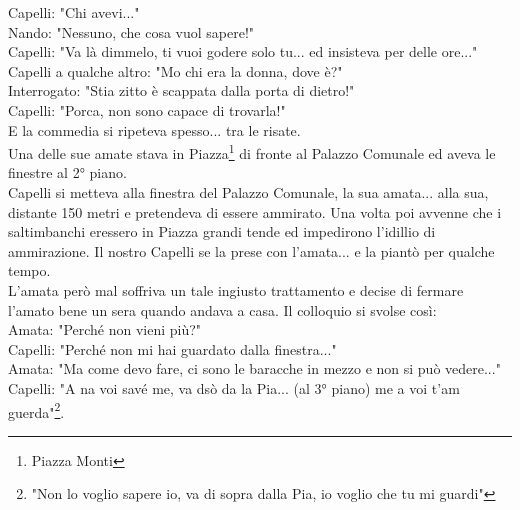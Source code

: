 Capelli: "Chi avevi..."\\
Nando: "Nessuno, che cosa vuol sapere!"\\
Capelli: "Va là dimmelo, ti vuoi godere solo tu... ed insisteva per delle ore..."\\
Capelli a qualche altro: "Mo chi era la donna, dove è?"\\
Interrogato: "Stia zitto è scappata dalla porta di dietro!"\\
Capelli: "Porca, non sono capace di trovarla!"\\
E la commedia si ripeteva spesso... tra le risate.\\
Una delle sue amate stava in Piazza\footnote{Piazza Monti} di fronte al Palazzo Comunale ed aveva le finestre al 2° piano.\\
Capelli si metteva alla finestra del Palazzo Comunale, la sua amata... alla sua, distante 150 metri e pretendeva di essere ammirato. Una volta poi avvenne che i saltimbanchi eressero in Piazza grandi tende ed impedirono l'idillio di ammirazione. Il nostro Capelli se la prese con l'amata... e la piantò per qualche tempo.\\
L'amata però mal soffriva un tale ingiusto trattamento e decise di fermare l'amato bene un sera quando andava a casa. Il colloquio si svolse così:\\
Amata: "Perché non vieni più?"\\
Capelli: "Perché non mi hai guardato dalla finestra..."\\
Amata: "Ma come devo fare, ci sono le baracche in mezzo e non si può vedere..."\\
Capelli: "A na voi savé me, va dsò da la Pia... (al 3° piano) me a voi t'am guerda"\footnote{"Non lo voglio sapere io, va di sopra dalla Pia, io voglio che tu mi guardi"}.\\
\newpage

